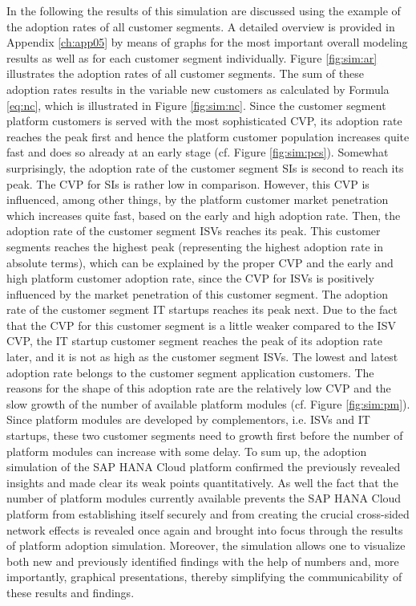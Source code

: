 In the following the results of this simulation are discussed using the example of the adoption rates of all customer segments. A detailed overview is provided in Appendix \ref{ch:app05} by means of graphs for the most important overall modeling results as well as for each customer segment individually. Figure \ref{fig:sim:ar} illustrates the adoption rates of all customer segments. The sum of these adoption rates results in the variable new customers as calculated by Formula \ref{eq:nc}, which is illustrated in Figure \ref{fig:sim:nc}. Since the customer segment platform customers is served with the most sophisticated \ac{CVP}, its adoption rate reaches the peak first and hence the platform customer population increases quite fast and does so already at an early stage (cf. Figure \ref{fig:sim:pcs}). Somewhat surprisingly, the adoption rate of the customer segment \acp{SI} is second to reach its peak. The \ac{CVP} for \acp{SI} is rather low in comparison. However, this \ac{CVP} is influenced, among other things, by the platform customer market penetration which increases quite fast, based on the early and high adoption rate. Then, the adoption rate of the customer segment \acp{ISV} reaches its peak. This customer segments reaches the highest peak (representing the highest adoption rate in absolute terms), which can be explained by the proper \ac{CVP} and the early and high platform customer adoption rate, since the \ac{CVP} for \acp{ISV} is positively influenced by the market penetration of this customer segment. The adoption rate of the customer segment \ac{IT} startups reaches its peak next. Due to the fact that the \ac{CVP} for this customer segment is a little weaker compared to the \ac{ISV} \ac{CVP}, the \ac{IT} startup customer segment reaches the peak of its adoption rate later, and it is not as high as the customer segment \acp{ISV}. The lowest and latest adoption rate belongs to the customer segment application customers. The reasons for the shape of this adoption rate are the relatively low \ac{CVP} and the slow growth of the number of available platform modules (cf. Figure \ref{fig:sim:pm}). Since platform modules are developed by complementors, i.e. \acp{ISV} and \ac{IT} startups, these two customer segments need to growth first before the number of platform modules can increase with some delay. To sum up, the adoption simulation of the SAP HANA Cloud platform confirmed the previously revealed insights and made clear its weak points quantitatively. As well the fact that the number of platform modules currently available prevents the SAP HANA Cloud platform from establishing itself securely and from creating the crucial cross-sided network effects is revealed once again and brought into focus through the results of platform adoption simulation. Moreover, the simulation allows one to visualize both new and previously identified findings with the help of numbers and, more importantly, graphical presentations, thereby simplifying the communicability of these results and findings.

